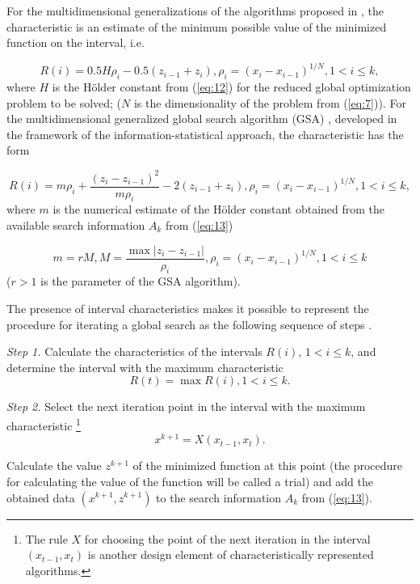 \documentclass[review]{elsarticle}
\begin{document}
For the multidimensional generalizations of the algorithms proposed in \cite{c22,c23}, the characteristic is an estimate of the minimum possible value of the minimized function on the interval, i.e.

\begin{equation}\label{eq:17}
R(i)=0.5 H \rho_i - 0.5 (z_{i-1} + z_i), \rho_i=(x_i - x_{i-1})^{1/N}, 1 < i \leq k,
\end{equation}
where $H$ is the H\"older constant from (\ref{eq:12}) for the reduced global optimization problem to be solved; ($N$ is the dimensionality of the problem from (\ref{eq:7})). For the multidimensional generalized global search algorithm (GSA) \cite{c5,c24}, developed in the framework of the information-statistical approach, the characteristic has the form

\begin{equation}\label{eq:18}
R(i)=m \rho_i+\frac{(z_i-z_{i-1})^2}{m \rho_i }-2(z_{i-1}+z_i ), \rho_i=(x_i-x_{i-1})^{1/N}  ,1 < i \leq k,
\end{equation}
where $m$ is the numerical estimate of the H\"older constant obtained from the available search information $A_k$ from (\ref{eq:13})

\begin{equation}\label{eq:19}
m=r M, M=\frac{\max|z_i-z_{i-1}|}{\rho_i}, \rho_i=(x_i-x_{i-1})^{1/N}  ,1 < i \leq k
\end{equation}
($r>1$ is the parameter of the GSA algorithm).

The presence of interval characteristics makes it possible to represent the procedure for iterating a global search as the following sequence of steps \cite{c5}.

\textit{Step 1.} Calculate the characteristics of the intervals $R(i)$, $1 < i \leq k$, and determine the interval with the maximum characteristic
\begin{equation}\label{eq:20}
R(t)=\max{R(i)}, 1 < i \leq k.
\end{equation}

\textit{Step 2.} Select the next iteration point in the interval with the maximum characteristic \footnote{The rule $X$ for choosing the point of the next iteration in the interval $(x_{t-1},x_t)$ is another design element of characteristically represented algorithms.}
\begin{equation}\label{eq:21}
x^{k+1}=X(x_{t-1},x_t ).
\end{equation}

Calculate the value $z^{k+1}$ of the minimized function at this point (the procedure for calculating the value of the function will be called a trial) and add the obtained data $(x^{k+1},z^{k+1})$ to the search information $A_k$ from (\ref{eq:13}).
\end{document}
